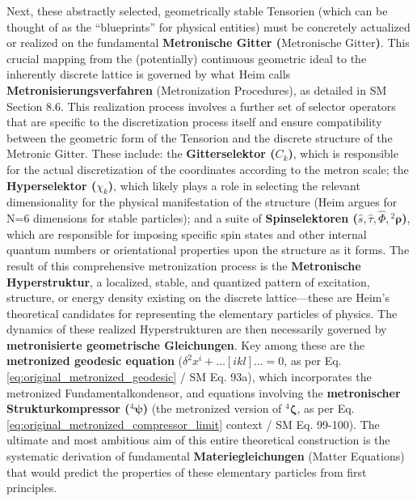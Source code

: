 \documentclass[12pt]{article}
\newcommand{\q}[1]{\enquote{#1}}
\newcommand{\metronischegitter}{\text{Metronische Gitter}}
\newcommand{\metrondifferential}{\delta}
\newcommand{\strukturkompressor}{{}^4\bm{\zeta}}
\newcommand{\metronischerstrukturkompressor}{{}^4\bm{\psi}}
\begin{document}
Next, these abstractly selected, geometrically stable Tensorien (which can be thought of as the \q{blueprints} for physical entities) must be concretely actualized or realized on the fundamental \textbf{Metronische Gitter (\(\metronischegitter\))}. This crucial mapping from the (potentially) continuous geometric ideal to the inherently discrete lattice is governed by what Heim calls \textbf{Metronisierungsverfahren} (Metronization Procedures), as detailed in SM Section 8.6. This realization process involves a further set of selector operators that are specific to the discretization process itself and ensure compatibility between the geometric form of the Tensorion and the discrete structure of the Metronic Gitter. These include: the \textbf{Gitterselektor (\(C_k\))}, which is responsible for the actual discretization of the coordinates according to the metron scale; the \textbf{Hyperselektor (\(\chi_k\))}, which likely plays a role in selecting the relevant dimensionality for the physical manifestation of the structure (Heim argues for N=6 dimensions for stable particles); and a suite of \textbf{Spinselektoren (\(\hat{s}, \hat{\tau}, \hat{\Phi}, {}^2\bm{\rho}\))}, which are responsible for imposing specific spin states and other internal quantum numbers or orientational properties upon the structure as it forms. The result of this comprehensive metronization process is the \textbf{Metronische Hyperstruktur}, a localized, stable, and quantized pattern of excitation, structure, or energy density existing on the discrete lattice—these are Heim's theoretical candidates for representing the elementary particles of physics. The dynamics of these realized Hyperstrukturen are then necessarily governed by \textbf{metronisierte geometrische Gleichungen}. Key among these are the \textbf{metronized geodesic equation} (\( \metrondifferential^2x^i + \dots[ikl]\dots = 0 \), as per Eq. \eqref{eq:original_metronized_geodesic} / SM Eq. 93a), which incorporates the metronized Fundamentalkondensor, and equations involving the \textbf{metronischer Strukturkompressor (\( \metronischerstrukturkompressor \))} (the metronized version of \( \strukturkompressor \), as per Eq. \eqref{eq:original_metronized_compressor_limit} context / SM Eq. 99-100). The ultimate and most ambitious aim of this entire theoretical construction is the systematic derivation of fundamental \textbf{Materiegleichungen} (Matter Equations) that would predict the properties of these elementary particles from first principles.
\end{document}
